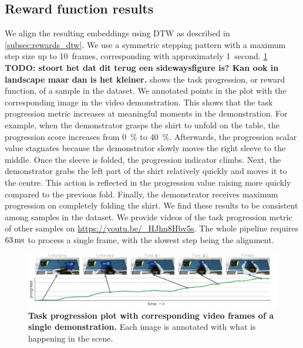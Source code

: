\documentclass[\home/main.tex]{subfiles}
\begin{document}
\subsection{Reward function results}
We align the resulting embeddings using DTW as described in \cref{subsec:rewards_dtw}. We use a symmetric stepping pattern \autocite{Rabiner1993} with a maximum step size up to 10~frames, corresponding with approximately 1~second. \cref{fig:rewards_reward_plot} \textbf{TODO: stoort het dat dit terug een sidewaysfigure is? Kan ook in landscape maar dan is het kleiner.} shows the task progression, or reward function, of a sample in the dataset. We annotated points in the plot with the corresponding image in the video demonstration. This shows that the task progression metric increases at meaningful moments in the demonstration. For example, when the demonstrator grasps the shirt to unfold on the table, the progression score increases from \qty{0}{\percent} to \qty{40}{\percent}. Afterwards, the progression scalar value stagnates because the demonstrator slowly moves the right sleeve to the middle. Once the sleeve is folded, the progression indicator climbs. Next, the demonstrator grabs the left part of the shirt relatively quickly and moves it to the centre. This action is reflected in the progression value raising more quickly compared to the previous fold. Finally, the demonstrator receives maximum progression on completely folding the shirt. We find these results to be consistent among samples in the dataset. We provide videos of the task progression metric of other samples on \url{https://youtu.be/_HJhn8Hbv5s}. The whole pipeline requires $63\mskip\thinmuskip \text{ms}$ to process a single frame, with the slowest step being the alignment.

\begin{figure}
    \centering
    \includegraphics[width=\textwidth,keepaspectratio]{figures/figs_cases_paper_reward_plot_383.jpg}
    \caption[Task progression plot with corresponding video frames of a single demonstration]{\textbf{Task progression plot with corresponding video frames of a single demonstration.} Each image is annotated with what is happening in the scene.}
    \label{fig:rewards_reward_plot}
\end{figure}
\end{document}
